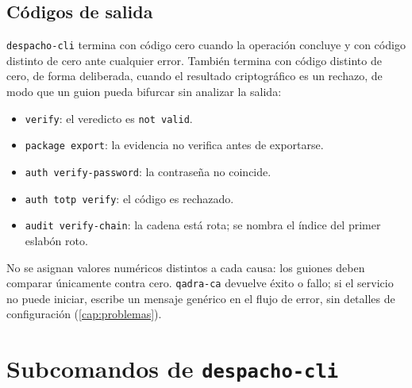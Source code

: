 \subsection{Códigos de salida}\label{sec:cli-salida}

\texttt{despacho-cli} termina con código cero cuando la operación concluye y
con código distinto de cero ante cualquier error. También termina con código
distinto de cero, de forma deliberada, cuando el resultado criptográfico es un
rechazo, de modo que un guion pueda bifurcar sin analizar la salida:

\begin{itemize}
  \item \texttt{verify}: el veredicto es \texttt{not valid}.
  \item \texttt{package export}: la evidencia no verifica antes de exportarse.
  \item \texttt{auth verify-password}: la contraseña no coincide.
  \item \texttt{auth totp verify}: el código es rechazado.
  \item \texttt{audit verify-chain}: la cadena está rota; se nombra el índice
    del primer eslabón roto.
\end{itemize}

No se asignan valores numéricos distintos a cada causa: los guiones deben
comparar únicamente contra cero. \texttt{qadra-ca} devuelve
éxito o fallo; si el servicio no puede iniciar, escribe un mensaje genérico en
el flujo de error, sin detalles de configuración (\cref{cap:problemas}).

\section{Subcomandos de \texttt{despacho-cli}}\label{sec:cli-despacho}

